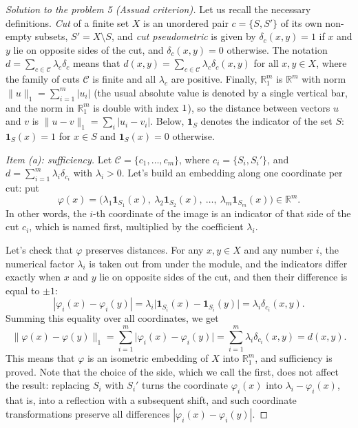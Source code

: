 \documentclass[a4paper,12pt]{report}
\begin{document}
\begin{proof}[Solution to the problem \textup{5} \textup{(}Assuad criterion\textup{)}]
Let us recall the necessary definitions. \emph{Cut} of a finite set $X$ is an unordered pair $c=\{S,S'\}$ of its own non-empty subsets, $S'=X\setminus S$, and \emph{cut pseudometric} is given by $\delta_c(x,y)=1$ if $x$ and $y$ lie on opposite sides of the cut, and $\delta_c(x,y)=0$ otherwise. The notation $d=\sum_{c\in\mathcal C}\lambda_c\delta_c$ means that $d(x,y)=\sum_{c\in\mathcal C}\lambda_c\delta_c(x,y)$ for all $x,y\in X$, where the family of cuts $\mathcal C$ is finite and all $\lambda_c$ are positive. Finally, $\mathbb R^m_1$ is $\mathbb R^m$ with norm $\|u\|_1=\sum_{i=1}^m|u_i|$ (the usual absolute value is denoted by a single vertical bar, and the norm in $\mathbb R^m_1$ is double with index $\textup{1}$), so the distance between vectors $u$ and $v$ is $\|u-v\|_1=\sum_i|u_i-v_i|$. Below, $\mathbf 1_S$ denotes the indicator of the set $S$\textup{:} $\mathbf 1_S(x)=1$ for $x\in S$ and $\mathbf 1_S(x)=0$ otherwise.

\textit{Item \textup{(a)}\textup{:} sufficiency.} Let $\mathcal C=\{c_1,\dots,c_m\}$, where $c_i=\{S_i,S_i'\}$, and $d=\sum_{i=1}^m\lambda_i\delta_{c_i}$ with $\lambda_i>0$. Let's build an embedding along one coordinate per cut\textup{:} put
\[
\varphi(x)=\bigl(\lambda_1\mathbf 1_{S_1}(x),\ \lambda_2\mathbf 1_{S_2}(x),\ \dots,\ \lambda_m\mathbf 1_{S_m}(x)\bigr)\in\mathbb R^m.
\]
In other words, the $i$-th coordinate of the image is an indicator of that side of the cut $c_i$, which is named first, multiplied by the coefficient $\lambda_i$.

Let's check that $\varphi$ preserves distances. For any $x,y\in X$ and any number $i$, the numerical factor $\lambda_i$ is taken out from under the module, and the indicators differ exactly when $x$ and $y$ lie on opposite sides of the cut, and then their difference is equal to $\pm1$\textup{:}
\[
|\varphi_i(x)-\varphi_i(y)|=\lambda_i\bigl|\mathbf 1_{S_i}(x)-\mathbf 1_{S_i}(y)\bigr|=\lambda_i\delta_{c_i}(x,y).
\]
Summing this equality over all coordinates, we get
\[
\|\varphi(x)-\varphi(y)\|_1=\sum_{i=1}^m\bigl|\varphi_i(x)-\varphi_i(y)\bigr|=\sum_{i=1}^m\lambda_i\delta_{c_i}(x,y)=d(x,y).
\]
This means that $\varphi$ is an isometric embedding of $X$ into $\mathbb R^m_1$, and sufficiency is proved. Note that the choice of the side, which we call the first, does not affect the result\textup{:} replacing $S_i$ with $S_i'$ turns the coordinate $\varphi_i(x)$ into $\lambda_i-\varphi_i(x)$, that is, into a reflection with a subsequent shift, and such coordinate transformations preserve all differences $|\varphi_i(x)-\varphi_i(y)|$.
\end{proof}
\end{document}
